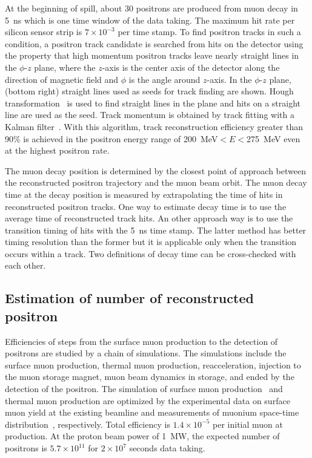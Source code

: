 At the beginning of spill, about 30 positrons are produced from muon decay in 5~ns which is one time window of the data taking.
The maximum hit rate per silicon sensor strip is $7 \times 10^{-3}$ per time stamp.
To find positron tracks in such a condition,
a positron track candidate is searched from hits on the detector
using the property that high momentum positron tracks leave
nearly straight lines in the $\phi$-$z$ plane, 
where the $z$-axis is the center axis of the detector along the direction of magnetic field and $\phi$ is the angle around $z$-axis.
In the $\phi$-$z$ plane, (bottom right) straight lines used as seeds for track finding are shown.
Hough transformation~\cite{HoughTransform,UseHough} is used
to find straight lines in the plane and hits on a straight line are used as the seed. 
Track momentum is obtained
by track fitting with a Kalman filter~\cite{KalmanFilter}.
With this algorithm, track reconstruction efficiency
greater than 90\% is achieved in the positron energy range of
200~MeV$<E<$275~MeV even at the highest positron rate.

The muon decay position is
determined by the closest point of approach between the reconstructed positron
trajectory and the muon beam orbit.
The muon decay time at the decay position is measured by extrapolating the time of hits in reconstructed
positron tracks. 
One way to estimate decay time is to use the average time of reconstructed 
track hits.
An other approach way is to use the transition timing of hits with the 5~ns time stamp.
The latter method has better timing resolution than the former but
it is applicable only when the transition occurs within a track.
Two definitions of decay time can be cross-checked with each other.

\subsection{Estimation of number of reconstructed positron}\label{sec:Intensity} 
Efficiencies of steps from the surface muon production to the detection of positrons are studied 
by a chain of simulations.
The simulations include the surface muon production,
thermal muon production, reacceleration, injection to the muon storage
magnet, muon beam dynamics in storage, and ended by the detection of the positron.
The simulation of surface muon production~\cite{otani:simulation_usm_production:ipac2018}
and thermal muon production are optimized by the experimental data
on surface muon yield at the existing beamline and measurements of muonium space-time distribution~\cite{Beer:2014ooa},
respectively.
Total efficiency is $1.4 \times 10^{-5}$ per initial muon at production.
At the proton beam power of 1~MW, the expected number of positrons is $5.7 \times 10^{11}$ for $2 \times 10^7$ seconds data taking.

